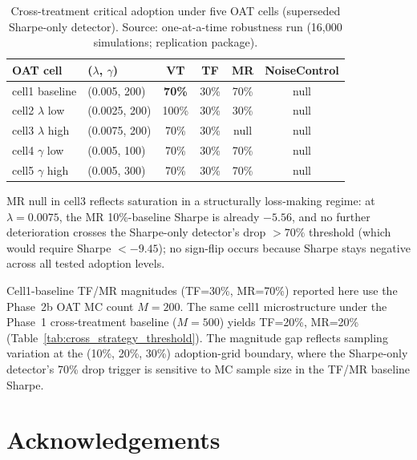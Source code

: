 \documentclass[12pt,a4paper]{article}
\begin{document}
\begin{table}[H]
\centering
\caption{Cross-treatment critical adoption under five OAT cells (superseded Sharpe-only detector). Source: one-at-a-time robustness run (16{,}000 simulations; replication package).}
\label{tab:oat_robustness}
\begin{threeparttable}
\begin{tabular}{llcccc}
\toprule
OAT cell & ($\lambda$, $\gamma$) & VT & TF & MR & NoiseControl \\
\midrule
cell1 baseline   & (0.005, 200)   & \textbf{70\%} & 30\% & 70\%       & null \\
cell2 $\lambda$ low  & (0.0025, 200)  & 100\%         & 30\% & 30\%       & null \\
cell3 $\lambda$ high & (0.0075, 200)  & 70\%          & 30\% & null\tnote{a} & null \\
cell4 $\gamma$ low   & (0.005, 100)   & 70\%          & 30\% & 70\%       & null \\
cell5 $\gamma$ high  & (0.005, 300)   & 70\%          & 30\% & 70\%       & null \\
\bottomrule
\end{tabular}
\begin{tablenotes}
\footnotesize
\item[a] MR null in cell3 reflects saturation in a structurally loss-making regime: at $\lambda = 0.0075$, the MR 10\%-baseline Sharpe is already $-5.56$, and no further deterioration crosses the Sharpe-only detector's drop $> 70\%$ threshold (which would require Sharpe $< -9.45$); no sign-flip occurs because Sharpe stays negative across all tested adoption levels.
\item[b] Cell1-baseline TF/MR magnitudes (TF=30\%, MR=70\%) reported here use the Phase~2b OAT MC count $M = 200$. The same cell1 microstructure under the Phase~1 cross-treatment baseline ($M = 500$) yields TF=20\%, MR=20\% (Table~\ref{tab:cross_strategy_threshold}). The magnitude gap reflects sampling variation at the (10\%, 20\%, 30\%) adoption-grid boundary, where the Sharpe-only detector's 70\% drop trigger is sensitive to MC sample size in the TF/MR baseline Sharpe.
\end{tablenotes}
\end{threeparttable}
\end{table}

\section*{Acknowledgements}
\end{document}

